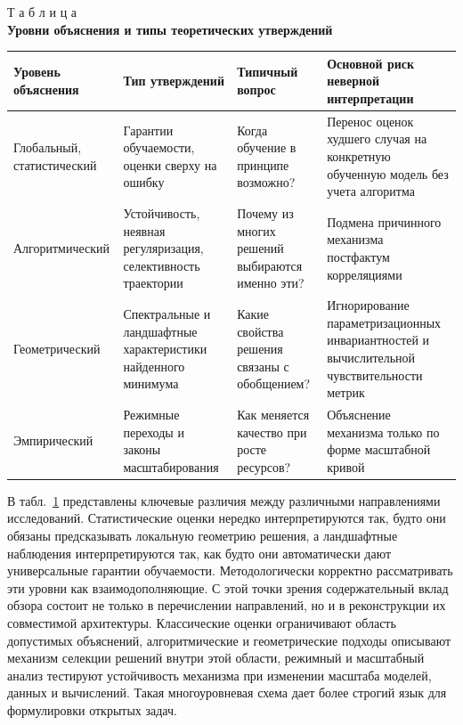 \documentclass[russian]{intsys}
\begin{document}
\begin{table}[htbp]
\label{tab:explanation_levels}
\begin{flushright}
{Т а б л и ц а \thetable}\\
\centering
\textbf{Уровни объяснения и типы теоретических утверждений}
\end{flushright}
\centering
\scriptsize
\setlength{\tabcolsep}{3pt}
\begin{tabular}{|>{\raggedright\arraybackslash}m{1.05in}|>{\raggedright\arraybackslash}m{1.15in}|>{\raggedright\arraybackslash}m{1.25in}|>{\raggedright\arraybackslash}m{1.55in}|}
\hline
Уровень объяснения & Тип утверждений & Типичный вопрос & Основной риск неверной интерпретации \\
\hline
Глобальный, статистический & Гарантии обучаемости, оценки сверху на ошибку & Когда обучение в принципе возможно? & Перенос оценок худшего случая на конкретную обученную модель без учета алгоритма \\
\hline
Алгоритмический & Устойчивость, неявная регуляризация, селективность траектории & Почему из многих решений выбираются именно эти? & Подмена причинного механизма постфактум корреляциями \\
\hline
Геометрический & Спектральные и ландшафтные характеристики найденного минимума & Какие свойства решения связаны с обобщением? & Игнорирование параметризационных инвариантностей и вычислительной чувствительности метрик \\
\hline
Эмпирический & Режимные переходы и законы масштабирования & Как меняется качество при росте ресурсов? & Объяснение механизма только по форме масштабной кривой \\
\hline
\end{tabular}
\end{table}

В табл.~\ref{tab:explanation_levels} представлены ключевые различия между различными направлениями исследований.
Статистические оценки нередко интерпретируются так, будто они обязаны предсказывать локальную геометрию решения, а ландшафтные наблюдения интерпретируются так, как будто они автоматически дают универсальные гарантии обучаемости.
Методологически корректно рассматривать эти уровни как взаимодополняющие.
С этой точки зрения содержательный вклад обзора состоит не только в перечислении направлений, но и в реконструкции их совместимой архитектуры.
Классические оценки ограничивают область допустимых объяснений, алгоритмические и геометрические подходы описывают механизм селекции решений внутри этой области, режимный и масштабный анализ тестируют устойчивость механизма при изменении масштаба моделей, данных и вычислений.
Такая многоуровневая схема дает более строгий язык для формулировки открытых задач.
\end{document}

